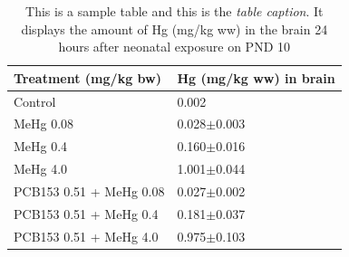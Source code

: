 \begin{table}[t]
\caption{This is a sample table and this is the \emph{table caption}. It displays the amount of Hg (mg/kg ww) in the brain 24 hours after neonatal exposure on PND 10}
\small
\begin{tabularx}{1\textwidth}{l X}
\toprule[0,5pt]
Treatment (mg/kg bw) & Hg (mg/kg ww) in brain\\
\midrule[0,5pt]
Control 					& 0.002\\
MeHg 0.08 				& 0.028\(\pm\)0.003\\
MeHg 0.4 					& 0.160\(\pm\)0.016\\
MeHg 4.0 					& 1.001\(\pm\)0.044\\
PCB153 0.51 + MeHg 0.08 	& 0.027\(\pm\)0.002\\
PCB153 0.51 + MeHg 0.4 	& 0.181\(\pm\)0.037\\
PCB153 0.51 + MeHg 4.0 	& 0.975\(\pm\)0.103\\
\bottomrule[0,5pt]
\end{tabularx}%
\end{table}	
